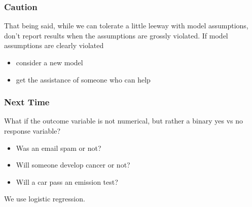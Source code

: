 \documentclass[handout]{beamer}
\newcommand{\blue}[1]{\textcolor{blue2}{#1}}
\begin{document}
\begin{frame}[fragile]
\frametitle{Caution}

That being said, while we can tolerate a little leeway with model assumptions, don't report results when the assumptions are grossly violated.  If model assumptions are clearly violated
\pause
\begin{itemize}
\item consider a new model
\item get the assistance of someone who can help
\end{itemize}

\end{frame}


\begin{frame}[fragile]
\frametitle{Next Time}

What if the outcome variable is not numerical, but rather a binary yes vs no response variable?

\pause \begin{itemize}
\item Was an email spam or not?
\item Will someone develop cancer or not?
\item Will a car pass an emission test?
\end{itemize}

\pause We use \blue{logistic regression}.  

\end{frame}
\end{document}
